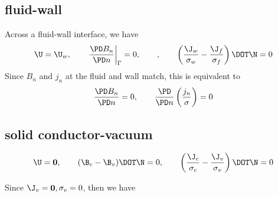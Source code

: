 \documentclass[11pt]{article}
\begin{document}
\subsection{fluid-wall}
Across a fluid-wall interface, we have
\begin{equation}
  \U = \U_w
  , \qquad
  \left. \frac{\PD B_n}{\PD n} \right|_{\Gamma} = 0
  , \qquad
  , \qquad
  \left( \frac{\J_w}{\sigma_w} -\frac{\J_f}{\sigma_f} \right) \DOT \N = 0
\end{equation}
Since $B_n$ and $j_n$ at the fluid and wall match, this is equivalent to
\begin{equation}
  \frac{\PD B_n}{\PD n} = 0
  , \qquad
  \frac{\PD}{\PD n} \left( \frac{j_n}{\sigma} \right) = 0
\end{equation}


\subsection{solid conductor-vacuum}
\begin{equation}
  \U = \mathbf{0}
  , \qquad
  (\B_c -\B_v) \DOT \N = 0
  , \qquad
  \left( \frac{\J_c}{\sigma_c} -\frac{\J_v}{\sigma_v} \right) \DOT \N = 0
\end{equation}

Since $\J_v = \mathbf{0},\sigma_v = 0$, then we have
\end{document}
